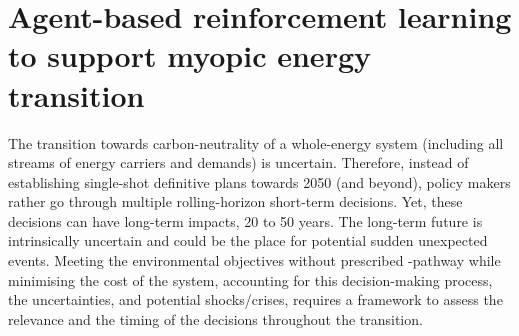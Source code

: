 \section{Agent-based reinforcement learning to support myopic energy transition}
\label{sec:meth:RL}

The transition towards carbon-neutrality of a whole-energy system (\ie including all streams of energy carriers and demands) is uncertain. Therefore, instead of establishing single-shot definitive plans towards 2050 (and beyond), policy makers rather go through multiple rolling-horizon short-term decisions. Yet, these decisions can have long-term impacts, 20 to 50 years. The long-term future is intrinsically uncertain and could be the place for potential sudden unexpected events. Meeting the environmental objectives without prescribed -pathway while minimising the cost of the system, accounting for this decision-making process, the uncertainties, and potential shocks/crises, requires a framework to assess the relevance and the timing of the decisions throughout the transition. 

